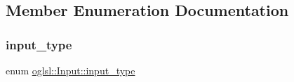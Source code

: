 \subsection{Member Enumeration Documentation}
\mbox{\label{classoglsl_1_1_input_a15a9c7fee0099a0ef55912433a402752}} 
\subsubsection{\texorpdfstring{input\+\_\+type}{input\_type}}
{\footnotesize\ttfamily enum \mbox{\hyperlink{classoglsl_1_1_input_a15a9c7fee0099a0ef55912433a402752}{oglsl\+::\+Input\+::input\+\_\+type}}}

